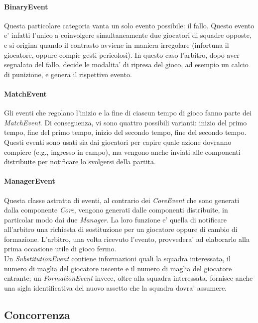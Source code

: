 \paragraph{BinaryEvent} Questa particolare categoria vanta un solo evento possibile: il fallo. Questo evento e' infatti l'unico a coinvolgere simultaneamente due giocatori di squadre opposte, e si origina quando il contrasto avviene in maniera irregolare (infortuna il giocatore, oppure compie gesti pericolosi). In questo caso l'arbitro, dopo aver segnalato del fallo, decide le modalita' di ripresa del gioco, ad esempio un calcio di punizione, e genera il rispettivo evento.

\paragraph{MatchEvent} Gli eventi che regolano l'inizio e la fine di ciascun tempo di gioco fanno parte dei \textit{MatchEvent}. Di conseguenza, vi sono quattro possibili varianti: inizio del primo tempo, fine del primo tempo, inizio del secondo tempo, fine del secondo tempo. Questi eventi sono usati sia dai giocatori per capire quale azione dovranno compiere (e.g., ingresso in campo), ma vengono anche inviati alle componenti distribuite per notificare lo svolgersi della partita.

\paragraph{ManagerEvent} Questa classe astratta di eventi, al contrario dei \textit{CoreEvent} che sono generati dalla componente \textit{Core}, vengono generati dalle componenti distribuite, in particolar modo dai due \textit{Manager}. La loro funzione e' quella di notificare all'arbitro una richiesta di sostituzione per un giocatore oppure di cambio di formazione. L'arbitro, una volta ricevuto l'evento, provvedera' ad elaborarlo alla prima occasione utile di gioco fermo.\\

Un \textit{SubstitutionEvent} contiene informazioni quali la squadra interessata, il numero di maglia del giocatore uscente e il numero di maglia del giocatore entrante; un \textit{FormationEvent} invece, oltre alla squadra interessata, fornisce anche una sigla identificativa del nuovo assetto che la squadra dovra' assumere.

\subsection{Concorrenza}
\label{sec:analisi_concorrenza}

